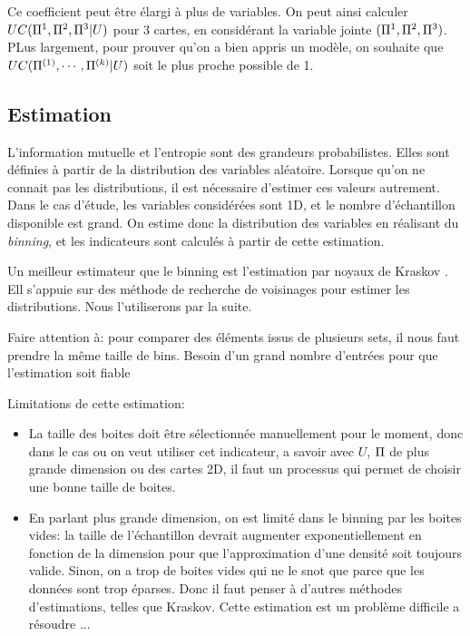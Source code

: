 Ce coefficient peut être élargi à plus de variables. On peut ainsi calculer $UC(\Pi^1,\Pi^2,\Pi^3|U)$ pour 3 cartes, en considérant la variable jointe $(\Pi^1,\Pi^2,\Pi^3)$. PLus largement, pour prouver qu'on a bien appris un modèle, on souhaite que $UC(\Pi^{({1})},\cdots,\Pi^{({k})}|U)$ soit le plus proche possible de 1.

\subsection{Estimation}

L'information mutuelle et l'entropie sont des grandeurs probabilistes. Elles sont définies à partir de la distribution des variables aléatoire. Lorsque qu'on ne connait pas les distributions, il est nécessaire d'estimer ces valeurs autrement. 
Dans le cas d'étude, les variables considérées sont 1D, et le nombre d'échantillon disponible est grand. On estime donc la distribution des variables en réalisant du \emph{binning}, et les indicateurs sont calculés à partir de cette estimation.

Un meilleur estimateur que le binning est l'estimation par noyaux de Kraskov \cite{2004kraskov}. Ell s'appuie sur des méthode de recherche de voisinages pour estimer les distributions. Nous l'utiliserons  
par la suite. 


Faire attention à: 
pour comparer des éléments issus de plusieurs sets, il nous faut prendre la même taille de bins. 
Besoin d'un grand nombre d'entrées pour que l'estimation soit fiable


Limitations de cette estimation:
\begin{itemize}
\item La taille des boites doit être sélectionnée manuellement pour le moment, donc dans le cas ou on veut utiliser cet indicateur, a savoir avec $U$, $\Pi$ de plus grande dimension ou des cartes 2D, il faut un processus qui permet de choisir une bonne taille de boites.
\item En parlant plus grande dimension, on est limité dans le binning par les boites vides: la taille de l'échantillon devrait augmenter exponentiellement en fonction de la dimension pour que l'approximation d'une densité soit toujours valide. Sinon, on a trop de boites vides qui ne le snot que parce que les données sont trop éparses. Donc il faut penser à d'autres méthodes d'estimations, telles que Kraskov. Cette estimation est un problème difficile a résoudre ...
\end{itemize}

